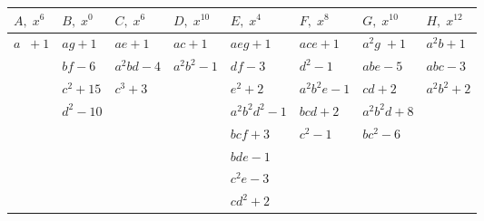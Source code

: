 \documentclass[11pt,a4paper]{article}
\begin{document}
\medskip
\noindent
\begin{tabular}{|l|l|l|l|l|l|l|l|}
\hline
$A,\;x^{6}$ & $B,\;x^{0}$ & $C,\;x^{6}$ & $D,\;x^{10}$ & $E,\;x^{4}$ & $F,\;x^{8}$ & $G,\;x^{10}$ & $H,\;x^{12}$\\
\hline
$a\;\;+1$ & $ag+1$ & $ae+1$ & $ac+1$ & $aeg+1$ & $ace+1$ & $a^{2}g\;+1$ & $a^{2}b+1$\\
 & $bf-6$ & $a^{2}bd-4$ & $a^{2}b^{2}-1$ & $df-3$ & $d^{2}-1$ & $abe-5$ & $abc-3$\\
 & $c^{2}+15$ & $c^{3}+3$ & & $e^{2}+2$ & $a^{2}b^{2}e-1$ & $cd+2$ & $a^{2}b^{2}+2$\\
 & $d^{2}-10$ & & & $a^{2}b^{2}d^{2}-1$ & $bcd+2$ & $a^{2}b^{2}d+8$ & \\
 & & & & $bcf+3$ & $c^{2}-1$ & $bc^{2}-6$ & \\
 & & & & $bde-1$ & & & \\
 & & & & $c^{2}e-3$ & & & \\
 & & & & $cd^{2}+2$ & & & \\
\hline
\end{tabular}
\end{document}
